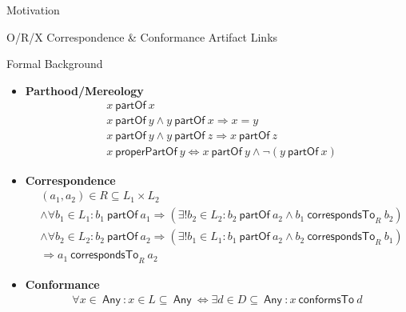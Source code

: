 \documentclass{beamer}
\newcommand{\partOf}{~\textsf{partOf}~}
\newcommand{\properPartOf}{~\textsf{properPartOf}~}
\newcommand{\Any}{~\textsf{Any}~}
\newcommand{\correspondsToR}[1]{~\textsf{correspondsTo}_{#1}~}
\newcommand{\conformsTo}{~\textsf{conformsTo}~}
\begin{document}
\begin{frame}[allowframebreaks]{Motivation}
\begin{center}
\newline
O/R/X Correspondence \& Conformance Artifact Links
\end{center}
\end{frame}

\begin{frame}{Formal Background}
\begin{itemize}
\item
\textbf{Parthood/Mereology}\cite{DBLP:conf/sle/Lammel16}\cite{DBLP:journals/dke/Varzi96}
{\scriptsize
\begin{align*}
&x \partOf x
\\&x \partOf y \wedge y \partOf x \Rightarrow x = y
\\&x \partOf y \wedge y \partOf z \Rightarrow x \partOf z
\\&x \properPartOf y \Leftrightarrow x \partOf y \wedge \neg(y \partOf x)
\end{align*}
}
\item
\textbf{Correspondence}\cite{DBLP:conf/sle/Lammel16}
{\scriptsize
\begin{align*}
&(a_1,a_2) \in R \subseteq L_1 \times L_2
\\&\wedge \forall b_1 \in L_1 : b_1 \partOf a_1 \Rightarrow (\exists! b_2 \in L_2 : b_2 \partOf a_2 \wedge b_1 \correspondsToR{R} b_2 )
\\&\wedge \forall b_2 \in L_2 : b_2 \partOf a_2 \Rightarrow (\exists! b_1 \in L_1 : b_1 \partOf a_2 \wedge b_2 \correspondsToR{R} b_1 )
\\&\Rightarrow a_1 \correspondsToR{R} a_2
\end{align*}
}
\item
\textbf{Conformance}\cite{DBLP:conf/sle/Lammel16}
{\scriptsize
\begin{align*}
\forall x \in \Any :
x \in L \subseteq \Any \Leftrightarrow \exists d \in D \subseteq \Any : x \conformsTo d
\end{align*}
}

\end{itemize}
\end{frame}
\end{document}
